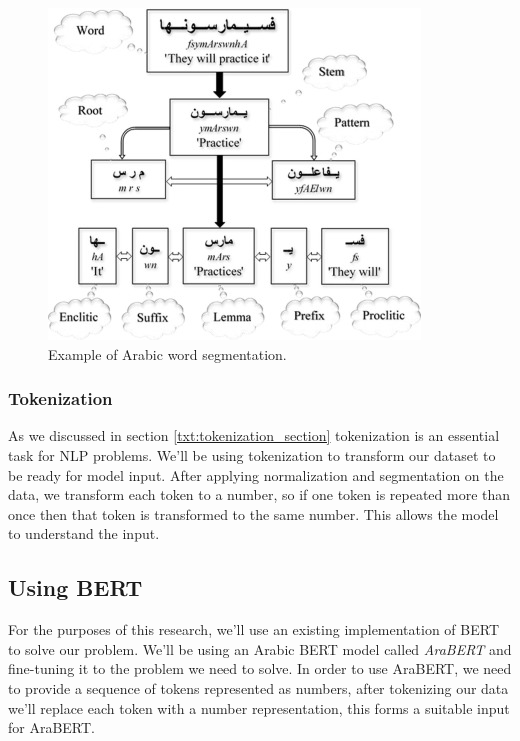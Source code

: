 \documentclass[12pt]{diazessay}
\begin{document}
            \begin{figure}[h]
                \includegraphics[scale=1]{Figures/arabic_segmentation.png}
                \caption{Example of Arabic word segmentation.\cite{arabic_segmentation}}
                \label{fig:arabic_segmentation}
            \end{figure}

            \subsubsection{Tokenization}
            As we discussed in section \ref{txt:tokenization_section} tokenization is an essential task for NLP problems. We'll be using tokenization to transform our dataset to be ready for model input. After applying normalization and segmentation on the data, we transform each token to a number, so if one token is repeated more than once then that token is transformed to the same number. This allows the model to understand the input.
            
        \subsection{Using BERT}
        For the purposes of this research, we'll use an existing implementation of BERT to solve our problem. We'll be using an Arabic BERT model called \emph{AraBERT} and fine-tuning it to the problem we need to solve.\cite{wissam}
        In order to use AraBERT, we need to provide a sequence of tokens represented as numbers, after tokenizing our data we'll replace each token with a number representation, this forms a suitable input for AraBERT.
            
\end{document}
